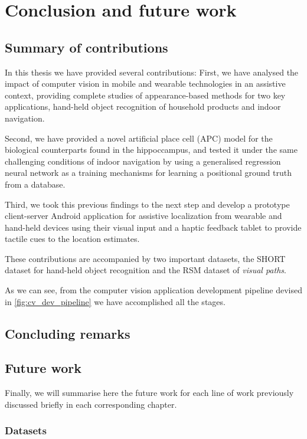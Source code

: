 \chapter{Conclusion and future work}\label{ch:conclusion}

\section{Summary of contributions}

In this thesis we have provided several contributions: First, we have analysed the impact of computer vision in mobile and wearable technologies in an assistive context, providing complete studies of appearance-based methods for two key applications, hand-held object recognition of household products and indoor navigation.

Second, we have provided a novel artificial place cell (APC) model for the biological counterparts found in the hippoccampus, and tested it under the same challenging conditions of indoor navigation by using a generalised regression neural network as a training mechanisms for learning a positional ground truth from a database.

Third, we took this previous findings to the next step and develop a prototype client-server Android application for assistive localization from wearable and hand-held devices using their visual input and a haptic feedback tablet to provide tactile cues to the location estimates.

These contributions are accompanied by two important datasets, the SHORT dataset for hand-held object recognition and the RSM dataset of \emph{visual paths}.

As we can see, from the computer vision application development pipeline devised in \ref{fig:cv_dev_pipeline} we have accomplished all the stages.

\section{Concluding remarks}

\section{Future work}

Finally, we will summarise here the future work for each line of work previously discussed briefly in each corresponding chapter.

\subsection{Datasets}

